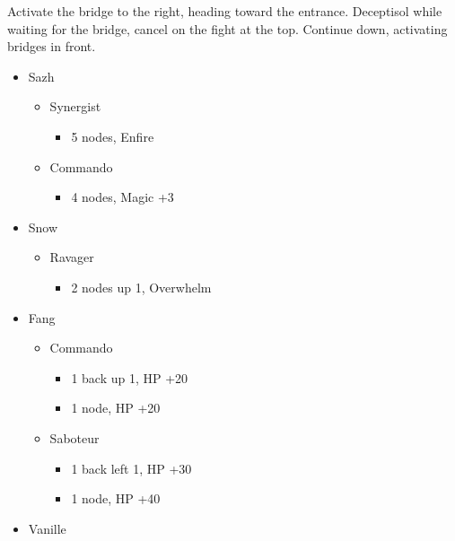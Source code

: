 \begin{multicols}{2}
Activate the bridge to the right, heading toward the entrance. Deceptisol while waiting for the bridge, cancel on the fight at the top. Continue down, activating bridges in front.
\vfill
\begin{menu}
\begin{itemize}
    \crystarium
    \begin{itemize}
        \item Sazh
        \begin{itemize}
            \item Synergist
            \begin{itemize}
                \item 5 nodes, Enfire
            \end{itemize}
            \item Commando
            \begin{itemize}
                \item 4 nodes, Magic +3
            \end{itemize}
        \end{itemize}
        \item Snow
        \begin{itemize}
            \item Ravager
            \begin{itemize}
                \item 2 nodes up 1, Overwhelm
            \end{itemize}
        \end{itemize}
        \item Fang
        \begin{itemize}
            \item Commando
            \begin{itemize}
                \item 1 back up 1, HP +20
                \item 1 node, HP +20
            \end{itemize}
            \item Saboteur
            \begin{itemize}
                \item 1 back left 1, HP +30
                \item 1 node, HP +40
            \end{itemize}
        \end{itemize}
        \item Vanille
        \begin{itemize}

\end{itemize}
\end{itemize}
\end{itemize}
\end{menu}
\end{multicols}
